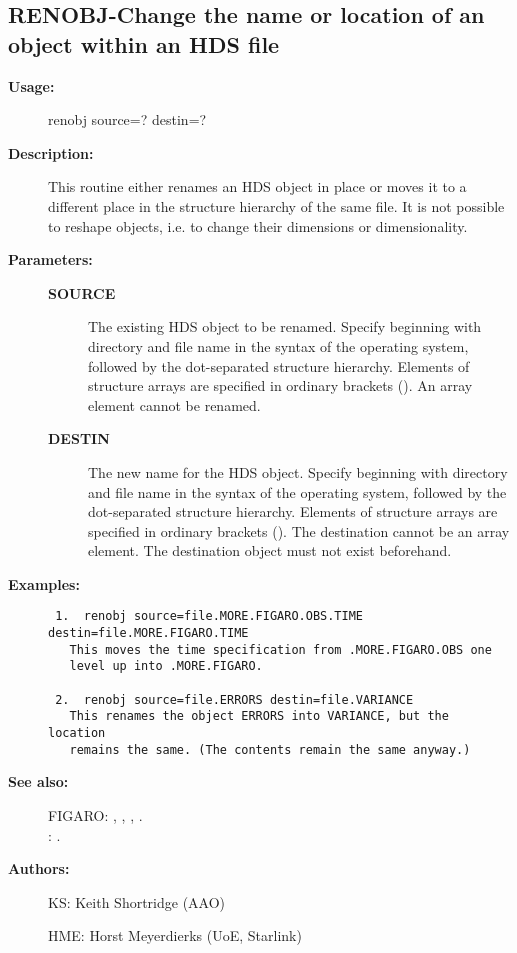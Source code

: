 \subsection{RENOBJ-\label{RENOBJ}Change the name or location of an object within an HDS file}
\begin{description}

\item [{\bf Usage:}]
 renobj source=? destin=?

\item [{\bf Description:}]
 This routine either renames an HDS object in place or moves it to
 a different place in the structure hierarchy of the same file. It
 is not possible to reshape objects, i.e. to change their
 dimensions or dimensionality.

\item [{\bf Parameters:}]
\begin{description}
\item [{\bf SOURCE}]
 The existing HDS object to be renamed.  Specify beginning with
 directory and file name in the syntax of the operating system,
 followed by the dot-separated structure hierarchy. Elements of
 structure arrays are specified in ordinary brackets (). An
 array element cannot be renamed.
\item [{\bf DESTIN}]
 The new name for the HDS object.  Specify beginning with
 directory and file name in the syntax of the operating system,
 followed by the dot-separated structure hierarchy. Elements of
 structure arrays are specified in ordinary brackets (). The
 destination cannot be an array element. The destination object
 must not exist beforehand.
\end{description}

\item [{\bf Examples:}]
\begin{verbatim}
 1.  renobj source=file.MORE.FIGARO.OBS.TIME destin=file.MORE.FIGARO.TIME
   This moves the time specification from .MORE.FIGARO.OBS one
   level up into .MORE.FIGARO.

 2.  renobj source=file.ERRORS destin=file.VARIANCE
   This renames the object ERRORS into VARIANCE, but the location
   remains the same. (The contents remain the same anyway.)

\end{verbatim}

\item [{\bf See also:}]
FIGARO: , , , .\\
: .\\

\item [{\bf Authors:}]
 KS: Keith Shortridge (AAO)

 HME: Horst Meyerdierks (UoE, Starlink)

\end{description}
